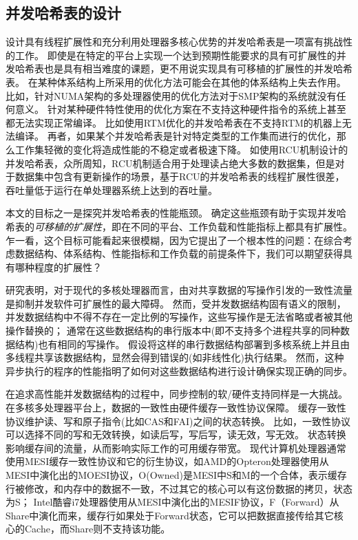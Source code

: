 \subsection{并发哈希表的设计}
设计具有线程扩展性和充分利用处理器多核心优势的并发哈希表是一项富有挑战性的工作。
即使是在特定的平台上实现一个达到预期性能要求的具有可扩展性的并发哈希表也是具有相当难度的课题，更不用说实现具有可移植的扩展性的并发哈希表。
在某种体系结构上所采用的优化方法可能会在其他的体系结构上失去作用\cite{baumann2009multikernel,david}。
比如，针对NUMA架构的多处理器使用的优化方法对于SMP架构的系统就没有任何意义\cite{david}。
针对某种硬件特性使用的优化方案在不支持这种硬件指令的系统上甚至都无法实现正常编译。
比如使用RTM优化的并发哈希表在不支持RTM的机器上无法编译。
再者，如果某个并发哈希表是针对特定类型的工作集而进行的优化，那么工作集轻微的变化将造成性能的不稳定或者极速下降。
如使用RCU机制设计的并发哈希表，众所周知，RCU机制适合用于处理读占绝大多数的数据集，但是对于数据集中包含有更新操作的场景，基于RCU的并发哈希表的线程扩展性很差，吞吐量低于运行在单处理器系统上达到的吞吐量\cite{urcu}。

本文的目标之一是探究并发哈希表的性能瓶颈。
确定这些瓶颈有助于实现并发哈希表的\textit{可移植的扩展性}，即在不同的平台、工作负载和性能指标上都具有扩展性。
乍一看，这个目标可能看起来很模糊，因为它提出了一个根本性的问题：在综合考虑数据结构、体系结构、性能指标和工作负载的前提条件下，我们可以期望获得具有哪种程度的扩展性？

研究表明，对于现代的多核处理器而言，由对共享数据的写操作引发的一致性流量是抑制并发软件可扩展性的最大障碍。
然而，受并发数据结构固有语义的限制，并发数据结构中不得不存在一定比例的写操作，这些写操作是无法省略或者被其他操作替换的；
通常在这些数据结构的串行版本中(即不支持多个进程共享的同种数据结构)也有相同的写操作。
假设将这样的串行数据结构部署到多核系统上并且由多线程共享该数据结构，显然会得到错误的(如非线性化\cite{herlihy1990linearizability})执行结果。
然而，这种异步执行的程序的性能指明了如何对这些数据结构进行设计确保实现正确的同步。

在追求高性能并发数据结构的过程中，同步控制的软/硬件支持同样是一大挑战。
在多核多处理器平台上，数据的一致性由硬件缓存一致性协议保障。
缓存一致性协议维护读、写和原子指令(比如CAS和FAI)之间的状态转换。
比如，一致性协议可以选择不同的写和无效转换，如读后写，写后写，读无效，写无效。
状态转换影响缓存间的流量，从而影响实际工作的可用缓存带宽。
现代计算机处理器通常使用MESI缓存一致性协议和它的衍生协议，如AMD的Opteron处理器使用从MESI中演化出的MOESI协议，O(Owned)是MESI中S和M的一个合体，表示缓存行被修改，和内存中的数据不一致，不过其它的核心可以有这份数据的拷贝，状态为S；
Intel酷睿i7处理器使用从MESI中演化出的MESIF协议，F（Forward）从Share中演化而来，缓存行如果处于Forward状态，它可以把数据直接传给其它核心的Cache，而Share则不支持该功能。

